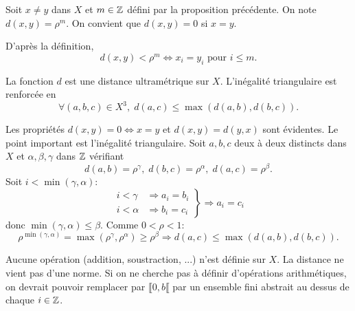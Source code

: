 \begin{defi}
 Soit $x\neq y$ dans $X$ et $m\in \mathbb{Z}$ défini par la proposition précédente. On note $d(x,y) = \rho ^m$. On convient que $d(x,y)=0$ si $x=y$.
\end{defi}
\begin{rem}
 D'après la définition,
 \begin{displaymath}
  d(x,y) < \rho^m \Leftrightarrow x_i = y_i \text{ pour } i \leq m.
 \end{displaymath}

\end{rem}
\begin{prop}
 La fonction $d$ est une distance ultramétrique sur $X$. L'inégalité triangulaire est renforcée en
 \begin{displaymath}
  \forall (a,b,c)\in X^3, \; d(a,c) \leq \max(d(a,b),d(b,c)).
 \end{displaymath}
\end{prop}
\begin{demo}
Les propriétés $d(x,y)=0 \Leftrightarrow x=y$ et $d(x,y)=d(y,x)$ sont évidentes. Le point important est l'inégalité triangulaire.\newline
Soit $a, b, c$ deux à deux distincts dans $X$ et $\alpha, \beta, \gamma$ dans $\mathbb{Z}$ vérifiant
\begin{displaymath}
 d(a,b) = \rho^\gamma, \; d(b,c) = \rho^\alpha, \; d(a,c) = \rho^\beta.
\end{displaymath}
Soit $i < \min(\gamma, \alpha)$:
\begin{displaymath}
 \left.
 \begin{aligned}
  i < \gamma &\Rightarrow a_i = b_i \\
  i < \alpha &\Rightarrow b_i = c_i
 \end{aligned}
 \right\rbrace
 \Rightarrow a_i = c_i
\end{displaymath}
donc $\min(\gamma,\alpha)\leq \beta$. Comme $0 <  \rho < 1$:
\begin{displaymath}
 \rho^{\min(\gamma,\alpha)}= \max(\rho^\gamma, \rho^\alpha) \geq \rho^\beta \Rightarrow d(a,c) \leq \max(d(a,b),d(b,c)).
\end{displaymath}
\end{demo}
\begin{rem}
 Aucune opération (addition, soustraction, ...) n'est définie sur $X$. La distance ne vient pas d'une norme. Si on ne cherche pas à définir d'opérations arithmétiques, on devrait pouvoir remplacer par $\llbracket 0,b \llbracket$ par un ensemble fini abstrait au dessus de chaque $i \in \mathbb{Z}$.
\end{rem}

